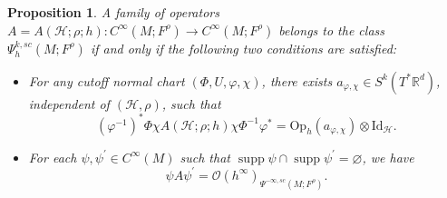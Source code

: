 \documentclass[11pt,oneside,reqno]{amsart}
\newcommand\Oph{\ensuremath{\mathrm{Op}_h}}
\newtheorem{proposition}[theorem]{Proposition}
\theoremstyle{definition}
\numberwithin{equation}{section}
\theoremstyle{plain}
\begin{document}
\begin{proposition}\label{criterionofpseudo}
A family of operators $A=A(\mathcal{H};\rho;h): C^{\infty}(M;F^{\rho}) \rightarrow C^{\infty}(M;F^{\rho})$ belongs to the class $\Psi_h^{k,sc}(M;F^\rho)$ if and only if the following two conditions are satisfied:
\begin{itemize}
\item For any cutoff normal chart $(\Phi, U,\varphi,\chi)$, there exists $a_{\varphi, \chi} \in S^k(T^*\mathbb{R}^d )$, independent of $(\mathcal{H},\rho)$, such that
\begin{equation}\label{pseudooflocal}
(\varphi^{-1})^*\Phi \chi A (\mathcal{H};\rho;h) \chi \Phi^{-1} \varphi^*=\Oph(a_{\varphi,\chi})\otimes \mathrm{Id}_{\mathcal{H}}.
\end{equation}
\item For each $\psi, \psi^{\prime} \in C^{\infty}(M)$ such that $\operatorname{supp} \psi \cap \operatorname{supp} \psi^{\prime}=\varnothing$, we have 
\begin{equation}\label{disresi}
    \psi A \psi^{\prime}=\mathcal{O} (h^{\infty} )_{\Psi^{-\infty,sc}(M;F^\rho)}.
\end{equation}
\end{itemize}
\end{proposition}
\end{document}
